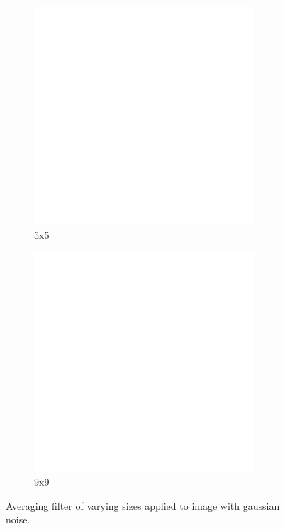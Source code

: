 \begin{figure}[h]
    \begin{subfigure}[b]{0.3\textwidth}
        \includegraphics[width=0.9\textwidth]{../code/2_out/2-1_gaus_5x5.png}
        \caption{5x5}
        \label{fig:2-1-2:3}
    \end{subfigure}
    \begin{subfigure}[b]{0.3\textwidth}
        \includegraphics[width=0.9\textwidth]{../code/2_out/2-1_gaus_9x9.png}
        \caption{9x9}
        \label{fig:2-1-2:4}
    \end{subfigure}

    \caption{Averaging filter of varying sizes applied to image with gaussian noise.}
    \label{fig:2-1-2}
\end{figure}

